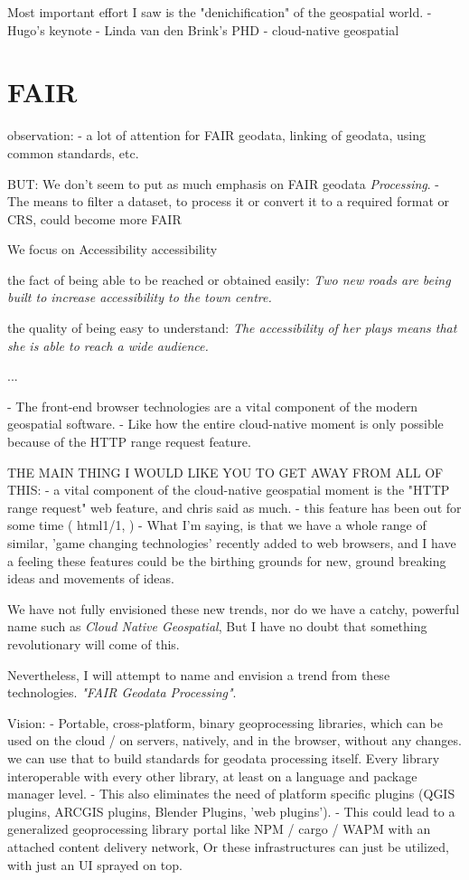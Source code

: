 Most important effort I saw is the "denichification" of the geospatial world.
- Hugo's keynote
- Linda van den Brink's PHD
- cloud-native geospatial 



\section{FAIR}

observation: 
- a lot of attention for FAIR geodata, linking of geodata, using common standards, etc. 

BUT: We don't seem to put as much emphasis on FAIR geodata \emph{Processing}. 
- The means to filter a dataset, to process it or convert it to a required format or CRS, could become more FAIR

We focus on Accessibility
accessibility

\m{->} the fact of being able to be reached or obtained easily:
\textit{Two new roads are being built to increase accessibility to the town centre.}

\m{->} the quality of being easy to understand: 
\textit{The accessibility of her plays means that she is able to reach a wide audience.}

...

- The front-end browser technologies are a vital component of the modern geospatial software.
- Like how the entire cloud-native moment is only possible because of the HTTP range request feature. 


THE MAIN THING I WOULD LIKE YOU TO GET AWAY FROM ALL OF THIS:
- a vital component of the cloud-native geospatial moment is the "HTTP range request" web feature, and chris said as much.
  - this feature has been out for some time ( html1/1, )
- What I'm saying, is that we have a whole range of similar, 'game changing technologies' recently added to web browsers, and I have a feeling these features could be the birthing grounds for new, ground breaking ideas and movements of ideas. 

We have not fully envisioned these new trends, nor do we have a catchy, powerful name such as \emph{Cloud Native Geospatial}, But I have no doubt that something revolutionary will come of this. 

Nevertheless, I will attempt to name and envision a trend from these technologies. \emph{"FAIR Geodata Processing"}.

Vision: 
- Portable, cross-platform, binary geoprocessing libraries, which can be used on the cloud / on servers, natively, and in the browser, without any changes. 
\m{->} we can use that to build standards for geodata processing itself. Every  library interoperable with every other library, at least on a language and package manager level.
- This also eliminates the need of platform specific plugins (QGIS plugins, ARCGIS plugins, Blender Plugins, 'web plugins').
- This could lead to a generalized geoprocessing library portal like NPM / cargo / WAPM with an attached content delivery network, Or these infrastructures can just be utilized, with just an UI sprayed on top.

